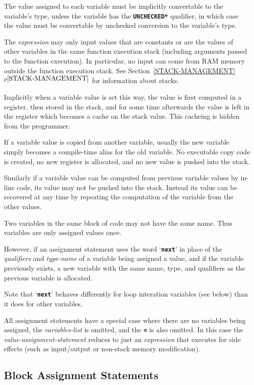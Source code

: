 \documentclass[12pt]{article}
\newcommand{\TT}[1]{{\tt \bfseries #1}}
\newcommand{\itemref}[1]{\ref{#1}$^{p\pageref{#1}}$}
\begin{document}
The value assigned to each variable
must be implicitly convertable to the variable's type, unless
the variable has the \TT{*UNCHECKED*} qualifier, in which case
the value must be convertable by unchecked conversion to the
variable's type.

The {\em expression} may only input values that are constants or are
the values of other variables in the same function execution
stack (including
arguments passed to the function execution).  In particular,
no input can come from RAM memory outside the function execution stack.
See Section~\itemref{STACK-MANAGEMENT} for information about stacks.

Implicitly when a variable value is set this way, the value is first
computed in a register, then stored in the stack, and for some time
afterwards the value is left in the register which becomes a cache
on the stack value.  This cacheing is hidden from the programmer.

If a variable value is copied from another variable, usually the
new variable simply becomes a compile-time alias for the old variable.
No executable copy code is created, no new register is allocated, and no new
value is pushed into the stack.

Similarly if a variable value can be computed from previous variable
values by in-line code, 
its value may not be pushed into the stack.  Instead its
value can be recovered at any time by repeating the computation
of the variable from the other values.

Two variables in the same block of code may not have the same
name.  Thus variables are only assigned values once.

However, if an assignment statement uses the word `\TT{next}' in
place of the {\em qualifiers} and {\em type-name}
of a variable being assigned a value, and
if the variable previously exists, a new variable with the same
name, type, and qualifiers as the previous variable is allocated.

Note that `\TT{next}' behaves differently for loop interation
variables (see below) than it does for other variables.

All assignment statements have a special case where there are
no variables being assigned, the {\em variables-list} is omitted,
and the \TT{=} is also omitted.  In this case the
{\em value-assignment-statement} reduces to just an {\em expression}
that executes for side effects (such as
input/output or non-stack memory modification).

\subsection{Block Assignment Statements}
\label{BlOCK-ASSIGNMENT-STATEMENTS}
\end{document}
